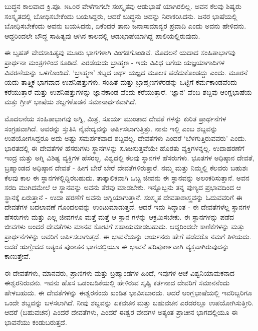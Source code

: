 ಬುದ್ಧನ ಕಾಲವಾದ ಕ್ರಿ.ಪೂ. ೫೬೦ರ ವೇಳೆಗಾಗಲೇ ಸಂಸ್ಕೃತವು ಆಡುಭಾಷೆ ಯಾಗಿರಲಿಲ್ಲ. ಅವನ ಕೆಲವು ಶಿಷ್ಯರು ಸಂಸ್ಕೃತದಲ್ಲಿ ಬೋಧಿಸಬೇಕೆಂದು ಬಯಸಿದ್ದರು, ಆದರೆ ಬುದ್ಧನು ಅದನ್ನು ನಿರಾಕರಿಸಿದನು. ಜನರ ಭಾಷೆಯಲ್ಲಿ ಬೋಧಿಸಬೇಕೆಂದು ಅವನು ಬಯಸಿದನು, ಏಕೆಂದರೆ ತಾನು ಜನಾಸಾಮಾನ್ಯರ ಪ್ರವಾದಿ ಎಂದು ಅವನು ಹೇಳಿದನು. ಆದ್ದರಿಂದಲೇ ಬೌದ್ಧ ಸಾಹಿತ್ಯವು ಆಗಿನ ಕಾಲದಲ್ಲಿ ಆಡುಭಾಷೆಯಾಗಿದ್ದ ಪಾಲಿಯಲ್ಲಿರುವುದು.

ಈ ಬೃಹತ್ ವೇದಸಾಹಿತ್ಯವು ಮೂರು ಭಾಗಗಳಾಗಿ ವಿಂಗಡಗೊಂಡಿವೆ. ಮೊದಲನೆ ಯದಾದ ಸಂಹಿತಾಭಾಗವು ಪ್ರಾರ್ಥನಾ ಮಂತ್ರಗಳಿಂದ ಕೂಡಿದೆ. ಎರಡೆಯದು ಬ್ರಾಹ್ಮಣ - ಇದು ವಿವಿಧ ಬಗೆಯ ಯಜ್ಞಯಾಗಾದಿಗಳ ವಿವರಣೆಯನ್ನು ಒಳಗೊಂಡಿದೆ. ‘ಬ್ರಾಹ್ಮಣ’ ಶಬ್ದದ ಅರ್ಥ ಯಜ್ಞದ ಮೂಲಕ ಪಡೆದುಕೊಂಡದ್ದು ಎಂದು. ಮೂರನೆ ಯದು ತಾತ್ತ್ವಿಕ ಭಾಗವಾದ ಉಪನಿಷತ್ತುಗಳು. ಸಂಹಿತೆ ಮತ್ತು ಬ್ರಾಹ್ಮಣಗಳೆರಡನ್ನು ಒಟ್ಟಿಗೆ ಕರ್ಮಕಾಂಡವೆಂದು ಕರೆಯುತ್ತಾರೆ ಮತ್ತು ಉಪನಿಷತ್ತುಗಳನ್ನು ಜ್ಞಾನಕಾಂಡ ವೆಂದು ಕರೆಯುತ್ತಾರೆ. ‘ಜ್ಞಾನ’ ವೆಂಬ ಶಬ್ದವು ಆಂಗ್ಲಭಾಷೆಯ  ಮತ್ತು ಗ್ರೀಕ್ ಭಾಷೆಯ  ಶಬ್ದಗಳೊಡನೆ ಸಮಾನಾರ್ಥಕವಾಗಿದೆ.

ಮೊದಲನೆಯ ಸಂಹಿತಾಭಾಗವು ಅಗ್ನಿ, ಮಿತ್ರ, ಸೂರ್ಯ ಮುಂತಾದ ದೇವತೆ ಗಳನ್ನು ಕುರಿತ ಪ್ರಾರ್ಥನೆಗಳ ಸಂಗ್ರಹವಾಗಿದೆ. ಅವರನ್ನು ಸ್ತುತಿಸಿ ನೈವೇದ್ಯವನ್ನು ಅರ್ಪಿಸಲಾಗುತ್ತಿತ್ತು. ನಾನು ಇಲ್ಲಿ  ಎಂಬ ಶಬ್ದವನ್ನು ಉಪಯೋಗಸಿದ್ದರೂ ಅದು ಅಷ್ಟು ಸಮರ್ಪಕವಾದ ಶಬ್ದವಲ್ಲ. ದೇವತೆಗಳು ಎಂದರೆ ‘ಬೆಳಗುತ್ತಿರುವವರು’ ಎಂದು. ಭಾರತದಲ್ಲಿ ಈ ದೇವತೆಗಳ ಹೆಸರುಗಳು ಸ್ಥಾನಗಳನ್ನು ಸೂಚಿಸುತ್ತವೆಯೇ ಹೊರತು ವ್ಯಕ್ತಿಗಳನ್ನಲ್ಲ. ಉದಾಹರಣೆಗೆ ಇಂದ್ರ ಮತ್ತು ಅಗ್ನಿ ವಿಶಿಷ್ಟ ವ್ಯಕ್ತಿಗಳ ಹೆಸರಲ್ಲ, ವಿಶ್ವದಲ್ಲಿ ಕೆಲವು ಸ್ಥಾನಗಳ ಹೆಸರುಗಳು. ಭೂತಗಳ ಅಧಿಷ್ಠಾನ ದೇವತೆ, ಬ್ರಹ್ಮಾಂಡದ ಅಧಿಷ್ಠಾನ ದೇವತೆ - ಹೀಗೆ ಬೇರೆ ಬೇರೆ ದೇವತೆಗಳಿರುತ್ತಾರೆ. ನಮ್ಮ ಮತ್ತು ನಿಮ್ಮಲ್ಲಿ ಕೆಲವರು ಬಹುಶಃ ಕೆಲವು ಕಾಲ ಈ ಸ್ಥಾನಗಳಲ್ಲಿದ್ದಿರಬಹುದು. ತಾತ್ಕಾಲಿಕವಾಗಿ ಒಬ್ಬ ಜೀವನು ಈ ಸ್ಥಾನವನ್ನು ಅಲಂಕರಿಸುತ್ತಾನೆ. ಅವನ ಸರದಿ ಮುಗಿದಮೇಲೆ ಆ ಸ್ಥಾನವನ್ನು ಅವನು ತೆರವು ಮಾಡಬೇಕು. ಇನ್ನೊಬ್ಬನು ತನ್ನ ಪುಣ್ಯದ ಪ್ರಭಾವದಿಂದ ಆ ಸ್ಥಾನಕ್ಕೆ ಏರುತ್ತಾನೆ - ಉದಾ ಹರಣೆಗೆ ಅವನು ಅಗ್ನಿಯಾಗುತ್ತಾನೆ. ಸಂಸ್ಕೃತ ದೇವತಾಶಾಸ್ತ್ರವನ್ನು ಓದುವವರಿಗೆ ಈ ದೇವತೆಗಳ ಬದಲಾವಣೆ ಗೊಂದಲವನ್ನು ಉಂಟುಮಾಡುತ್ತದೆ. ಆದರೆ ಇದು ಸಿದ್ಧಾಂತ - ಈ ದೇವತೆಗಳೆಲ್ಲ ಸ್ಥಾನಗಳ ಹೆಸರುಗಳು ಮತ್ತು ಎಲ್ಲ ಜೀವಗಳೂ ಮತ್ತೆ ಮತ್ತೆ ಆ ಸ್ಥಾನ ಗಳನ್ನು ಆಕ್ರಮಿಸಬೇಕು. ಈ ಸ್ಥಾನಗಳನ್ನು ಪಡೆದ ಜೀವಗಳು ಅಂದರೆ ದೇವತೆಗಳು ಮಾನವ ಕೋಟಿಗೆ ಸಹಾಯಮಾಡಬಹುದು. ಆದ್ದರಿಂದಲೇ ಕಾಣಿಕೆಗಳನ್ನು ಮತ್ತು ಪ್ರಾರ್ಥನೆಗಳನ್ನು ಅವರಿಗೆ ಅರ್ಪಿಸಲಾಗುತ್ತದೆ. ಈ ಭಾವನೆಯನ್ನು ಆರ್ಯನರು ಹೇಗೆ ಪಡೆದರೊ ನಮಗೆ ತಿಳಿಯದು. ಆದರೆ ಋಗ್ವೇದದ ಅತ್ಯಂತ ಪುರಾತನ ಭಾಗದಲ್ಲಿಯೂ ಈ ಭಾವನೆ ಪರಿಪೂರ್ಣವಾಗಿ ವ್ಯಕ್ತವಾಗಿರುವುದನ್ನು ಕಾಣುತ್ತೇವೆ.

ಈ ದೇವತೆಗಳು, ಮಾನವರು, ಪ್ರಾಣಿಗಳು ಮತ್ತು ಬ್ರಹ್ಮಾಂಡಗಳ ಹಿಂದೆ, ಇವುಗಳ ಆಚೆ ವಿಶ್ವನಿಯಾಮಕನಾದ ಈಶ್ವರನಿರುವನು. ಇವನು ಹೊಸ ಒಡಂಬಡಿಕೆಯಲ್ಲಿ ಹೇಳಿರುವ ಸೃಷ್ಟಿ ಕರ್ತನಾದ ದೇವರಿಗೆ  ಸಮಾನನೆಂದು ಹೇಳಬಹುದು. ಈ ದೇವತೆಗಳನ್ನು ಈಶ್ವರನೆಂದು ಖಂಡಿತ ಭಾವಿಸಬಾರದು. ಆದರೆ ಆಂಗ್ಲಭಾಷೆಯಲ್ಲಿ ಇವರಿಬ್ಬರಿಗೂ ಒಂದೇ ಶಬ್ದವನ್ನು ಬಳಸಲಾಗಿದೆ. ನೀವು ಶಬ್ದವನ್ನು ಏಕವಚನ ಮತ್ತು ಬಹುವಚನ ಎರಡರಲ್ಲೂ ಉಪಯೋಗಿಸುತ್ತೀರಿ. ಆದರೆ (ಬಹುವಚನ) ಎಂದರೆ ದೇವತೆಗಳು,  ಎಂದರೆ ಈಶ್ವರ ವೇದಗಳ ಅತ್ಯಂತ ಪ್ರಾಚೀನ ಭಾಗದಲ್ಲಿಯೂ ಈ ಭಾವನೆಯು ಕಂಡುಬರುತ್ತದೆ.

